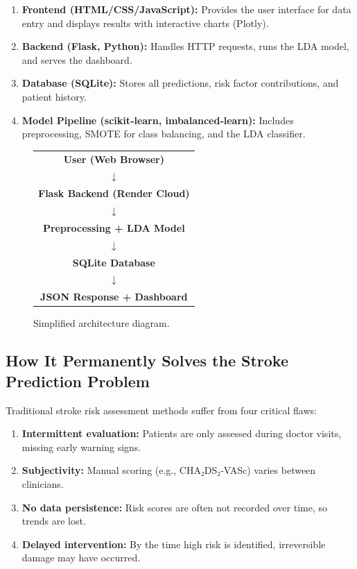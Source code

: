 \documentclass[12pt,a4paper]{article}
\begin{document}
\begin{enumerate}
    \item \textbf{Frontend (HTML/CSS/JavaScript):} Provides the user interface for data entry and displays results with interactive charts (Plotly).
    \item \textbf{Backend (Flask, Python):} Handles HTTP requests, runs the LDA model, and serves the dashboard.
    \item \textbf{Database (SQLite):} Stores all predictions, risk factor contributions, and patient history.
    \item \textbf{Model Pipeline (scikit‑learn, imbalanced‑learn):} Includes preprocessing, SMOTE for class balancing, and the LDA classifier.
\end{enumerate}

\begin{figure}[H]
\centering
\begin{tabular}{|c|}
\hline
\textbf{User (Web Browser)} \\
\(\downarrow\) \\
\textbf{Flask Backend (Render Cloud)} \\
\(\downarrow\) \\
\textbf{Preprocessing + LDA Model} \\
\(\downarrow\) \\
\textbf{SQLite Database} \\
\(\downarrow\) \\
\textbf{JSON Response + Dashboard} \\
\hline
\end{tabular}
\caption{Simplified architecture diagram.}
\label{fig:architecture}
\end{figure}

\subsection{How It Permanently Solves the Stroke Prediction Problem}

Traditional stroke risk assessment methods suffer from four critical flaws:

\begin{enumerate}
    \item \textbf{Intermittent evaluation:} Patients are only assessed during doctor visits, missing early warning signs.
    \item \textbf{Subjectivity:} Manual scoring (e.g., CHA₂DS₂‑VASc) varies between clinicians.
    \item \textbf{No data persistence:} Risk scores are often not recorded over time, so trends are lost.
    \item \textbf{Delayed intervention:} By the time high risk is identified, irreversible damage may have occurred.
\end{enumerate}
\end{document}
